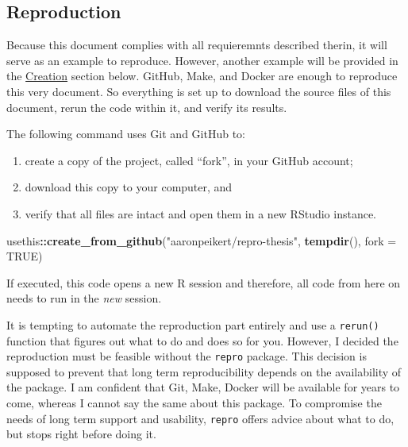 \documentclass[12pt,a4paper,]{article}
\newenvironment{Shaded}{\begin{snugshade}}{\end{snugshade}}
\newcommand{\DataTypeTok}[1]{\textcolor[rgb]{0.13,0.29,0.53}{#1}}
\newcommand{\KeywordTok}[1]{\textcolor[rgb]{0.13,0.29,0.53}{\textbf{#1}}}
\newcommand{\NormalTok}[1]{#1}
\newcommand{\OperatorTok}[1]{\textcolor[rgb]{0.81,0.36,0.00}{\textbf{#1}}}
\newcommand{\OtherTok}[1]{\textcolor[rgb]{0.56,0.35,0.01}{#1}}
\newcommand{\StringTok}[1]{\textcolor[rgb]{0.31,0.60,0.02}{#1}}
\providecommand{\tightlist}{%
  \setlength{\itemsep}{0pt}\setlength{\parskip}{0pt}}
\begin{document}
\hypertarget{reproduction}{%
\subsection{Reproduction}\label{reproduction}}

Because this document complies with all requieremnts described therin, it will serve as an example to reproduce.
However, another example will be provided in the \protect\hyperlink{creation}{Creation} section below.
GitHub, Make, and Docker are enough to reproduce this very document.
So everything is set up to download the source files of this document, rerun the code within it, and verify its results.

The following command uses Git and GitHub to:

\begin{enumerate}
\def\labelenumi{\arabic{enumi}.}
\tightlist
\item
  create a copy of the project, called ``fork'', in your GitHub account;
\item
  download this copy to your computer, and
\item
  verify that all files are intact and open them in a new RStudio instance.
\end{enumerate}

\begin{Shaded}
\begin{Highlighting}[]
\NormalTok{usethis}\OperatorTok{::}\KeywordTok{create_from_github}\NormalTok{(}\StringTok{"aaronpeikert/repro-thesis"}\NormalTok{,}
                            \KeywordTok{tempdir}\NormalTok{(),}
                            \DataTypeTok{fork =} \OtherTok{TRUE}\NormalTok{)}
\end{Highlighting}
\end{Shaded}

If executed, this code opens a new R session and therefore, all code from here on needs to run in the \emph{new} session.

It is tempting to automate the reproduction part entirely and use a \texttt{rerun()} function that figures out what to do and does so for you.
However, I decided the reproduction must be feasible without the \texttt{repro} package.
This decision is supposed to prevent that long term reproducibility depends on the availability of the package.
I am confident that Git, Make, Docker will be available for years to come, whereas I cannot say the same about this package.
To compromise the needs of long term support and usability, \texttt{repro} offers advice about what to do, but stops right before doing it.
\end{document}

